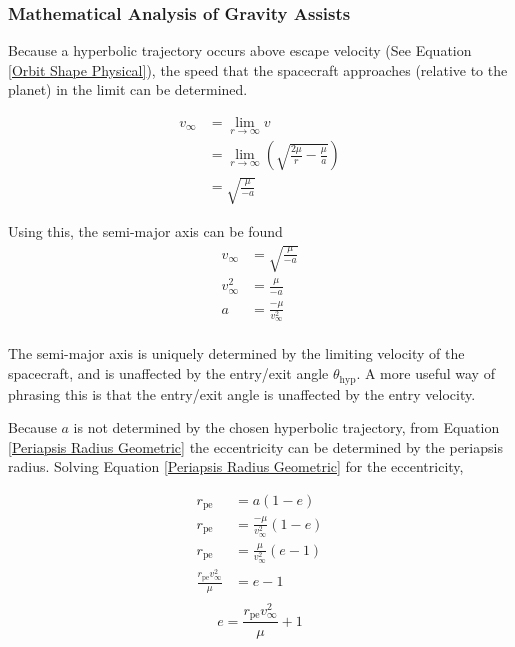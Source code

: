 \documentclass{article}
\begin{document}
\subsubsection{Mathematical Analysis of Gravity Assists}

Because a hyperbolic trajectory occurs above escape velocity (See Equation \eqref{Orbit Shape Physical}), the speed that the spacecraft approaches (relative to the planet) in the limit can be determined.

\begin{align*}
    v_\infty & = \lim_{r\rightarrow\infty}v                                                \\
             & = \lim_{r\rightarrow\infty}\left(\sqrt{\frac{2\mu}{r}-\frac{\mu}{a}}\right) \\
             & = \sqrt{\frac{\mu}{-a}}
\end{align*}

Using this, the semi-major axis can be found
\begin{align*}
    v_\infty   & = \sqrt{\frac{\mu}{-a}}   \\
    v_\infty^2 & = \frac{\mu}{-a}          \\
    a          & = \frac{-\mu}{v_\infty^2} \\
\end{align*}

The semi-major axis is uniquely determined by the limiting velocity of the spacecraft, and is unaffected by the entry/exit angle $\theta_\text{hyp}$. A more useful way of phrasing this is that the entry/exit angle is unaffected by the entry velocity.

Because $a$ is not determined by the chosen hyperbolic trajectory, from Equation \eqref{Periapsis Radius Geometric} the eccentricity can be determined by the periapsis radius. Solving Equation \eqref{Periapsis Radius Geometric} for the eccentricity,

\begin{align*}
    r_\text{pe}                       & =a(1-e)                       \\
    r_\text{pe}                       & =\frac{-\mu}{v_\infty^2}(1-e) \\
    r_\text{pe}                       & =\frac{\mu}{v_\infty^2}(e-1)  \\
    \frac{r_\text{pe}v_\infty^2}{\mu} & =e-1                          \\
\end{align*}
\begin{equation}\label{Hyperbolic Flyby Eccentricity}
    e=\frac{r_\text{pe}v_\infty^2}{\mu}+1
\end{equation}
\end{document}
